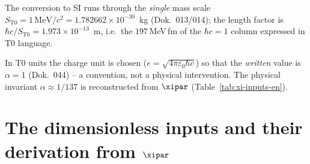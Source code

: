 \begin{table}[htbp]
  \centering
  \caption{Quantity conversion in natural units ($\hbar=c=k_B=1$): all
           dimensionful quantities become powers of energy.}
  \label{tab:nat-umrechnung-en}
  {\small
  }

  \medskip
  \footnotesize
  The conversion to SI runs through the \emph{single} mass scale
  $S_{\mathrm{T0}} = 1\,\mathrm{MeV}/c^2 = 1{.}782662\times10^{-30}$~kg (Dok.~013/014);
  the length factor is $\hbar c/S_{\mathrm{T0}} = 1{.}973\times10^{-13}$~m, i.e.\ the
  $197$\,MeV\,fm of the $\hbar c=1$ column expressed in T0 language.\par\smallskip
  In T0 units the charge unit is chosen ($e=\sqrt{4\pi\varepsilon_0\hbar c}$) so that
  the \emph{written} value is $\alpha=1$ (Dok.~044) -- a convention, not a physical
  intervention. The physical invariant $\alpha\approx1/137$ is reconstructed from
  $\xipar$ (Table~\ref{tab:xi-inputs-en}).
\end{table}

\section{The dimensionless inputs and their derivation from $\xipar$}

